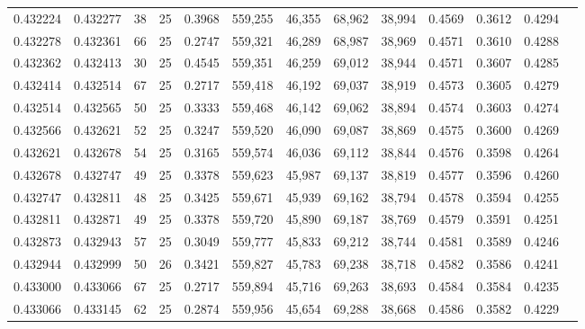 \begin{tabular}{rrrrrrrrrrrrr}
0.432224 & 0.432277 &    38 &  25 &                                     0.3968 & 559,255 &  46,355 &  68,962 &  38,994 & 0.4569 & 0.3612 & 0.4294 \\
0.432278 & 0.432361 &    66 &  25 &                                     0.2747 & 559,321 &  46,289 &  68,987 &  38,969 & 0.4571 & 0.3610 & 0.4288 \\
0.432362 & 0.432413 &    30 &  25 &                                     0.4545 & 559,351 &  46,259 &  69,012 &  38,944 & 0.4571 & 0.3607 & 0.4285 \\
0.432414 & 0.432514 &    67 &  25 &                                     0.2717 & 559,418 &  46,192 &  69,037 &  38,919 & 0.4573 & 0.3605 & 0.4279 \\
0.432514 & 0.432565 &    50 &  25 &                                     0.3333 & 559,468 &  46,142 &  69,062 &  38,894 & 0.4574 & 0.3603 & 0.4274 \\
0.432566 & 0.432621 &    52 &  25 &                                     0.3247 & 559,520 &  46,090 &  69,087 &  38,869 & 0.4575 & 0.3600 & 0.4269 \\
0.432621 & 0.432678 &    54 &  25 &                                     0.3165 & 559,574 &  46,036 &  69,112 &  38,844 & 0.4576 & 0.3598 & 0.4264 \\
0.432678 & 0.432747 &    49 &  25 &                                     0.3378 & 559,623 &  45,987 &  69,137 &  38,819 & 0.4577 & 0.3596 & 0.4260 \\
0.432747 & 0.432811 &    48 &  25 &                                     0.3425 & 559,671 &  45,939 &  69,162 &  38,794 & 0.4578 & 0.3594 & 0.4255 \\
0.432811 & 0.432871 &    49 &  25 &                                     0.3378 & 559,720 &  45,890 &  69,187 &  38,769 & 0.4579 & 0.3591 & 0.4251 \\
0.432873 & 0.432943 &    57 &  25 &                                     0.3049 & 559,777 &  45,833 &  69,212 &  38,744 & 0.4581 & 0.3589 & 0.4246 \\
0.432944 & 0.432999 &    50 &  26 &                                     0.3421 & 559,827 &  45,783 &  69,238 &  38,718 & 0.4582 & 0.3586 & 0.4241 \\
0.433000 & 0.433066 &    67 &  25 &                                     0.2717 & 559,894 &  45,716 &  69,263 &  38,693 & 0.4584 & 0.3584 & 0.4235 \\
0.433066 & 0.433145 &    62 &  25 &                                     0.2874 & 559,956 &  45,654 &  69,288 &  38,668 & 0.4586 & 0.3582 & 0.4229 \\

\end{tabular}
